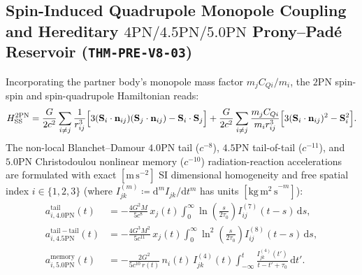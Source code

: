 \documentclass[11pt,a4paper,reqno]{article}
\theoremstyle{plain}
\theoremstyle{definition}
\theoremstyle{remark}
\numberwithin{equation}{section}
\begin{document}
\subsection{Spin-Induced Quadrupole Monopole Coupling and Hereditary \texorpdfstring{$4\mathrm{PN}/4.5\mathrm{PN}/5.0\mathrm{PN}$}{4PN/4.5PN/5.0PN} Prony--Pad\'e Reservoir (\texttt{THM-PRE-V8-03})}
Incorporating the partner body's monopole mass factor $m_j C_{Qi}/m_i$, the $2\mathrm{PN}$ spin-spin and spin-quadrupole Hamiltonian reads:
\begin{equation}
\label{eq:spin_quadrupole_v8}
H_{\mathrm{SS}}^{2\mathrm{PN}} = \frac{G}{2c^2}\sum_{i\neq j}\frac{1}{r_{ij}^3}\Bigl[3(\mathbf{S}_i\cdot\mathbf{n}_{ij})(\mathbf{S}_j\cdot\mathbf{n}_{ij}) - \mathbf{S}_i\cdot\mathbf{S}_j\Bigr] + \frac{G}{2c^2}\sum_{i\neq j}\frac{m_j C_{Qi}}{m_i r_{ij}^3}\Bigl[3(\mathbf{S}_i\cdot\mathbf{n}_{ij})^2 - \mathbf{S}_i^2\Bigr].
\end{equation}
The non-local Blanchet--Damour $4.0\mathrm{PN}$ tail ($c^{-8}$), $4.5\mathrm{PN}$ tail-of-tail ($c^{-11}$), and $5.0\mathrm{PN}$ Christodoulou nonlinear memory ($c^{-10}$) radiation-reaction accelerations are formulated with exact $[\mathrm{m\,s^{-2}}]$ SI dimensional homogeneity and free spatial index $i \in \{1,2,3\}$ (where $I_{jk}^{(m)} \coloneqq \mathrm{d}^m I_{jk}/\mathrm{d}t^m$ has units $[\mathrm{kg\,m^2\,s}^{-m}]$):
\begin{align}
\label{eq:40pn_tail_v8}
a_{i,4.0\mathrm{PN}}^{\mathrm{tail}}(t) &= -\frac{4G^2 M}{5c^8}\,x_j(t)\int_0^\infty \ln\!\left(\frac{s}{2\tau_0}\right) I_{ij}^{(7)}(t-s)\,\mathrm{d}s, \\
\label{eq:45pn_tail_v8}
a_{i,4.5\mathrm{PN}}^{\mathrm{tail-tail}}(t) &= -\frac{4G^3 M^2}{5c^{11}}\,x_j(t)\int_0^\infty \ln^2\!\left(\frac{s}{2\tau_0}\right) I_{ij}^{(8)}(t-s)\,\mathrm{d}s, \\
\label{eq:50pn_memory_v8}
a_{i,5.0\mathrm{PN}}^{\mathrm{memory}}(t) &= -\frac{2G^2}{5c^{10}\,r(t)}\,n_i(t)\,I_{jk}^{(4)}(t)\int_{-\infty}^t \frac{I_{jk}^{(4)}(t')}{t - t' + \tau_0}\,\mathrm{d}t'.
\end{align}
\end{document}
